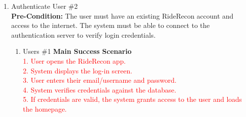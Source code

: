 \documentclass[]{article}
\begin{document}
\begin{enumerate}[label={\bf BE\arabic*.}]
\begin{enumerate}
\begin{enumerate}
			\end{enumerate}
		\end{enumerate}
	\item Authenticate User \#2 \\
	\textbf{Pre-Condition:} The user must have an existing RideRecon account and access to the internet. The system must be able to connect to the authentication server to verify login credentials.
	\begin{enumerate}[label={\bf VP\arabic*.}]
		\item Users \#1 
			\textbf{Main Success Scenario} \\  
			\textcolor{red}{1. User opens the RideRecon app.} \\  
			\textcolor{red}{2. System displays the log-in screen.} \\  
			\textcolor{red}{3. User enters their email/username and password.} \\  
			\textcolor{red}{4. System verifies credentials against the database.} \\  
			\textcolor{red}{5. If credentials are valid, the system grants access to the user and loads the homepage.} \\


\end{enumerate}
\end{enumerate}
\end{document}
